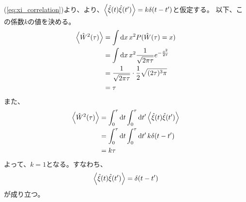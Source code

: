 \documentclass[a4paper,11pt]{jsarticle}
\numberwithin{equation}{section}
\begin{document}
(\ref{eq:xi_correlation})より、より、$\ev{\hat{\xi}(t) \hat{\xi}(t')} = k\delta(t-t')$と仮定する。
以下、この係数$k$の値を決める。
\begin{align}
  \ev{\hat{W}^2(\tau)} &= \int \dd{x}x^2 P(\hat{W}(\tau)=x) \\
  &= \int \dd{x}x^2 \frac{1}{\sqrt{2\pi \tau}} e^{-\frac{x^2}{2\tau}} \\
  &= \frac{1}{\sqrt{2\pi \tau}} \cdot \frac{1}{2} \sqrt{(2\tau)^3 \pi} \\
  &= \tau
\end{align}
また、
\begin{align}
  \ev{\hat{W}^2(\tau)} &= \int_0^{\tau} \dd{t} \int_0^{\tau} \dd{t'} \ev{\hat{\xi}(t) \hat{\xi}(t')} \\
  &= \int_0^{\tau} \dd{t} \int_0^{\tau} \dd{t'} k\delta(t-t') \\
  &= k\tau
\end{align}
よって、$k=1$となる。すなわち、
\begin{align}
    \ev{\hat{\xi}(t) \hat{\xi}(t')} = \delta(t-t')
\end{align}
が成り立つ。\\
\end{document}

